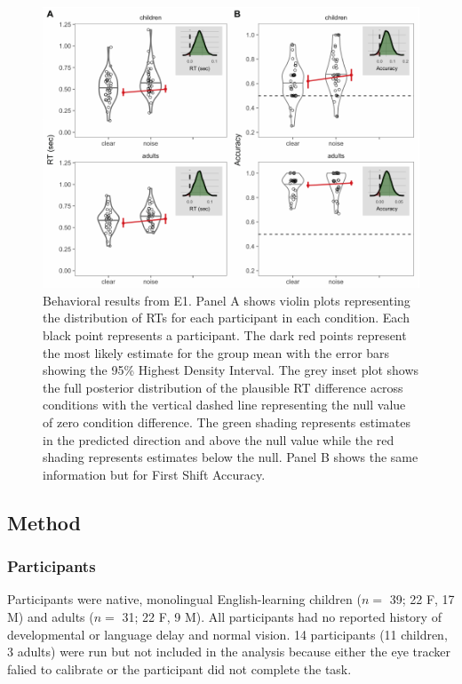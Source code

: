 \documentclass[10pt, letterpaper]{article}
\newenvironment{CodeChunk}{}{}
\begin{document}
\begin{CodeChunk}
\begin{figure}[t]

{\centering \includegraphics[width=0.7\linewidth]{figs/noise_acc_rt_e1_plot-1} 

}

\caption[Behavioral results from E1]{Behavioral results from E1. Panel A shows violin plots representing the distribution of RTs for each participant in each condition. Each black point represents a participant. The dark red points represent the most likely estimate for the group mean with the error bars showing the 95\% Highest Density Interval. The grey inset plot shows the full posterior distribution of the plausible RT difference across conditions with the vertical dashed line representing the null value of zero condition difference. The green shading represents estimates in the predicted direction and above the null value while the red shading represents estimates below the null. Panel B shows the same information but for First Shift Accuracy.}\label{fig:noise_acc_rt_e1_plot}
\end{figure}
\end{CodeChunk}

\subsection{Method}\label{method}

\subsubsection{Participants}\label{participants}

Participants were native, monolingual English-learning children (\(n=\)
39; 22 F, 17 M) and adults (\(n=\) 31; 22 F, 9 M). All participants had
no reported history of developmental or language delay and normal
vision. 14 participants (11 children, 3 adults) were run but not
included in the analysis because either the eye tracker falied to
calibrate or the participant did not complete the task.
\end{document}
